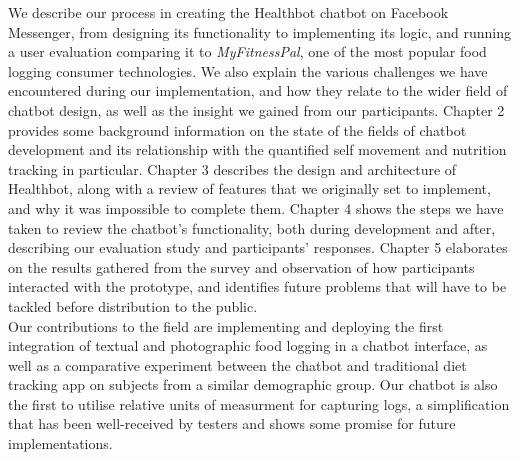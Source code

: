 We describe our process in creating the Healthbot chatbot on Facebook Messenger, from designing its functionality to implementing its logic, and running a user evaluation comparing it to \textit{MyFitnessPal}, one of the most popular food logging consumer technologies. We also explain the various challenges we have encountered during our implementation, and how they relate to the wider field of chatbot design, as well as the insight we gained from our participants. Chapter 2 provides some background information on the state of the fields of chatbot development and its relationship with the quantified self movement and nutrition tracking in particular. Chapter 3 describes the design and architecture of Healthbot, along with a review of features that we originally set to implement, and why it was impossible to complete them. Chapter 4 shows the steps we have taken to review the chatbot's functionality, both during development and after, describing our evaluation study and participants' responses. Chapter 5 elaborates on the results gathered from the survey and observation of how participants interacted with the prototype, and identifies future problems that will have to be tackled before distribution to the public.\\
Our contributions to the field are implementing and deploying the first integration of textual and photographic food logging in a chatbot interface, as well as a comparative experiment between the chatbot and traditional diet tracking app on subjects from a similar demographic group. Our chatbot is also the first to utilise relative units of measurment for capturing logs, a simplification that has been well-received by testers and shows some promise for future implementations.

